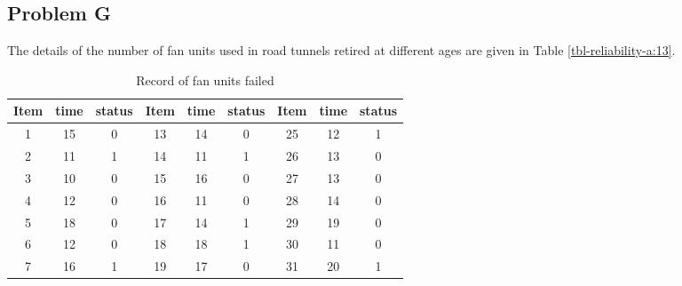 \subsection{Problem G}
The details of the number of fan units used in road tunnels retired at different
ages are given in Table \ref{tbl-reliability-a:13}.
\begin{table}[h]
\caption{Record of fan units failed}
\begin{tabular}{|l|l|l|l|l|l|l|l|l|}
\hline
\multicolumn{1}{|c|}{Item} & \multicolumn{1}{c|}{time} & \multicolumn{1}{c|}{status} & \multicolumn{1}{c|}{Item} & \multicolumn{1}{c|}{time} & \multicolumn{1}{c|}{status} & \multicolumn{1}{c|}{Item} & \multicolumn{1}{c|}{time} & \multicolumn{1}{c|}{status} \\ 
\hline
\multicolumn{1}{|c|}{1} & \multicolumn{1}{c|}{15} & \multicolumn{1}{c|}{0} & \multicolumn{1}{c|}{13} & \multicolumn{1}{c|}{14} & \multicolumn{1}{c|}{0} & \multicolumn{1}{c|}{25} & \multicolumn{1}{c|}{12} & \multicolumn{1}{c|}{1} \\ 
\hline
\multicolumn{1}{|c|}{2} & \multicolumn{1}{c|}{11} & \multicolumn{1}{c|}{1} & \multicolumn{1}{c|}{14} & \multicolumn{1}{c|}{11} & \multicolumn{1}{c|}{1} & \multicolumn{1}{c|}{26} & \multicolumn{1}{c|}{13} & \multicolumn{1}{c|}{0} \\ 
\hline
\multicolumn{1}{|c|}{3} & \multicolumn{1}{c|}{10} & \multicolumn{1}{c|}{0} & \multicolumn{1}{c|}{15} & \multicolumn{1}{c|}{16} & \multicolumn{1}{c|}{0} & \multicolumn{1}{c|}{27} & \multicolumn{1}{c|}{13} & \multicolumn{1}{c|}{0} \\ 
\hline
\multicolumn{1}{|c|}{4} & \multicolumn{1}{c|}{12} & \multicolumn{1}{c|}{0} & \multicolumn{1}{c|}{16} & \multicolumn{1}{c|}{11} & \multicolumn{1}{c|}{0} & \multicolumn{1}{c|}{28} & \multicolumn{1}{c|}{14} & \multicolumn{1}{c|}{0} \\ 
\hline
\multicolumn{1}{|c|}{5} & \multicolumn{1}{c|}{18} & \multicolumn{1}{c|}{0} & \multicolumn{1}{c|}{17} & \multicolumn{1}{c|}{14} & \multicolumn{1}{c|}{1} & \multicolumn{1}{c|}{29} & \multicolumn{1}{c|}{19} & \multicolumn{1}{c|}{0} \\ 
\hline
\multicolumn{1}{|c|}{6} & \multicolumn{1}{c|}{12} & \multicolumn{1}{c|}{0} & \multicolumn{1}{c|}{18} & \multicolumn{1}{c|}{18} & \multicolumn{1}{c|}{1} & \multicolumn{1}{c|}{30} & \multicolumn{1}{c|}{11} & \multicolumn{1}{c|}{0} \\ 
\hline
\multicolumn{1}{|c|}{7} & \multicolumn{1}{c|}{16} & \multicolumn{1}{c|}{1} & \multicolumn{1}{c|}{19} & \multicolumn{1}{c|}{17} & \multicolumn{1}{c|}{0} & \multicolumn{1}{c|}{31} & \multicolumn{1}{c|}{20} & \multicolumn{1}{c|}{1} \\ 

\end{tabular}
\end{table}
